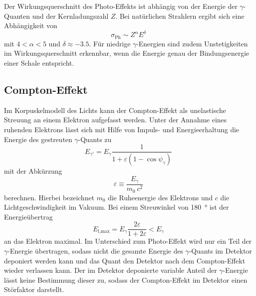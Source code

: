 Der Wirkungsquerschnitt des Photo-Effekts ist abhängig von der Energie der
$\gamma$-Quanten und der Kernladungszahl $Z$.
Bei natürlichen Strahlern ergibt sich eine Abhängigkeit von
\begin{equation*}
	\sigma_\text{Ph} \sim Z^\alpha E^\delta
\end{equation*}
mit $4 < \alpha < 5$ und $\delta \approx \num{-3.5}$.
Für niedrige $\gamma$-Energien sind zudem Unstetigkeiten im Wirkungsquerschnitt
erkennbar, wenn die Energie genau der Bindungsenergie einer Schale entspricht.

\subsection{Compton-Effekt}
\label{sec:Compton-Effekt}

Im Korpuskelmodell des Lichts kann der Compton-Effekt als unelastische
Streuung an einem Elektron aufgefasst werden.
Unter der Annahme eines ruhenden Elektrons lässt sich mit Hilfe von Impuls-
und Energieerhaltung die Energie des gestreuten $\gamma$-Quants zu
\begin{equation}
	E_{\gamma'} = E_\gamma
	\frac{1}{1 + \varepsilon \left(1 - \cos \psi_\gamma\right)}
	\label{eqn:Compton-Energy}
\end{equation}
mit der Abkürzung
\begin{equation*}
	\varepsilon \equiv \frac{E_\gamma}{m_\text{0}\:c^2}
\end{equation*}
berechnen.
Hierbei bezeichnet $m_0$ die Ruheenergie des Elektrons und
$c$ die Lichtgeschwindigkeit im Vakuum.
Bei einem Streuwinkel von \SI{180}{\degree} ist der Energieübertrag
\begin{equation*}
	E_\text{l,max} = E_\gamma \frac{2 \varepsilon}{1 + 2 \varepsilon} < E_\gamma
\end{equation*}
an das Elektron maximal.
Im Unterschied zum Photo-Effekt wird nur ein Teil der $\gamma$-Energie übertragen,
sodass nicht die gesamte Energie des $\gamma$-Quants im Detektor deponiert werden kann und
das Quant den Detektor nach dem Compton-Effekt wieder verlassen kann.
Der im Detektor deponierte variable Anteil der $\gamma$-Energie lässt keine
Bestimmung dieser zu, sodass der Compton-Effekt im Detektor einen Störfaktor
darstellt.


